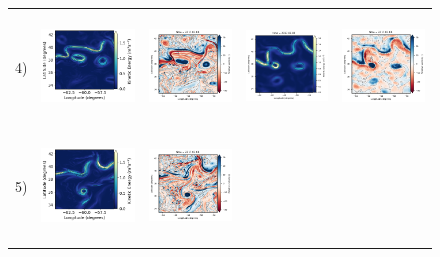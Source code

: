 \documentclass[draft]{agujournal2019}
\begin{document}
\begin{figure}[H]
\begin{center}
\begin{tabular}{ccccc}
\hspace{-10mm} 4) &
 \includegraphics[trim={0 16mm 26mm 5mm},clip, width=3.3cm,height=2.9cm]{figures/plots2/natl60_train_ke.png} &
 \includegraphics[trim={13mm 13mm 22mm 6mm},clip, width=2.9cm,height=2.9cm]{figures/plots/natl60_train_vort_r.png} &
 \includegraphics[trim={13mm 13mm 22mm 6mm},clip, width=2.9cm,height=2.9cm]{figures/plots/natl60_rec_ke.png} &
 \includegraphics[trim={13mm 13mm 22mm 6mm},clip,width=2.9cm,height=2.9cm]{figures/plots/natl60_rec_vort_r.png} \\
\hspace{-10mm} 5) &
\includegraphics[trim={0 16mm 26mm 5mm},clip, width=3.3cm,height=2.9cm]{figures/plots2/enatl60-t_train_ke.png} &
\includegraphics[trim={13mm 13mm 22mm 6mm},clip, width=2.9cm,height=2.9cm]{figures/plots/enatl60-t_train_vort_r.png} &

\end{tabular}
\end{center}
\end{figure}
\end{document}
